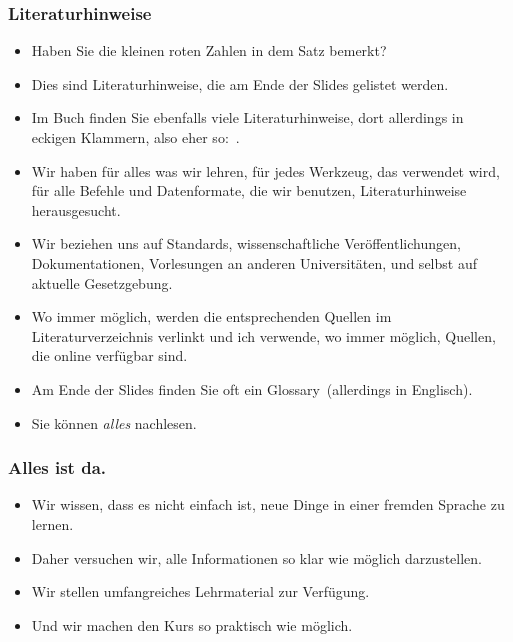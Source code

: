 \documentclass[aspectratio=169,mathserif,notheorems]{beamer}%
\begin{document}
%
\begin{frame}%
\frametitle{Literaturhinweise}%
\begin{itemize}%
\item Haben Sie die kleinen roten Zahlen in dem Satz \emph{} bemerkt?%
\item<2-> Dies sind Literaturhinweise, die am Ende der Slides gelistet werden.%
\item<3-> Im Buch  finden Sie ebenfalls viele Literaturhinweise, dort allerdings in eckigen Klammern, also eher so:~.%
\item<4-> Wir haben für alles was wir lehren, für jedes Werkzeug, das verwendet wird, für alle Befehle und Datenformate, die wir benutzen, Literaturhinweise herausgesucht.%
\item<5-> Wir beziehen uns auf Standards, wissenschaftliche Veröffentlichungen, Dokumentationen, Vorlesungen an anderen Universitäten, und selbst auf aktuelle Gesetzgebung.%
\item<6-> Wo immer möglich, werden die entsprechenden Quellen im Literaturverzeichnis verlinkt und ich verwende, wo immer möglich, Quellen, die online verfügbar sind.%
\item<7-> Am Ende der Slides finden Sie oft ein Glossary~(allerdings in Englisch).%
\item<8-> Sie können \emph{alles} nachlesen.%
\end{itemize}%
\end{frame}%
%
\begin{frame}%
\frametitle{Alles ist da.}%
\begin{itemize}%
\item Wir wissen, dass es nicht einfach ist, neue Dinge in einer fremden Sprache zu lernen.%
\item<2-> Daher versuchen wir, alle Informationen so klar wie möglich darzustellen.%
\item<3-> Wir stellen umfangreiches Lehrmaterial zur Verfügung.%
\item<4-> Und wir machen den Kurs so praktisch wie möglich.%
\end{itemize}%
\end{frame}%
%
\end{document}
